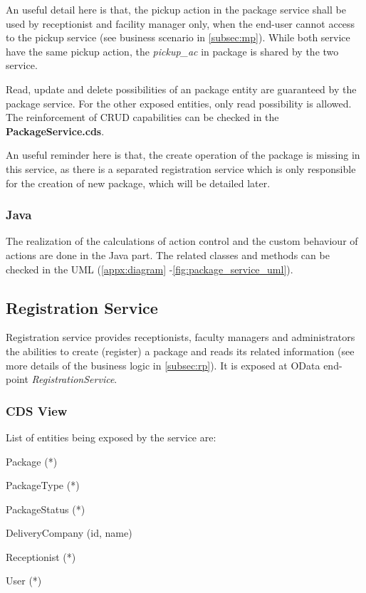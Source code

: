 An useful detail here is that, the pickup action in the package service shall be used by receptionist and facility manager only, when the end-user cannot access to the pickup service (see business scenario in \autoref{subsec:mp}). While both service have the same pickup action, the \textit{pickup\_ac} in package is shared by the two service.

Read, update and delete possibilities of an package entity are guaranteed by the package service. For the other exposed entities, only read possibility is allowed. The reinforcement of CRUD capabilities can be checked in the \textbf{PackageService.cds}. 

An useful reminder here is that, the create operation of the package is missing in this service, as there is a separated registration service which is only responsible for the creation of new package, which will be detailed later.

\subsubsection{Java}

The realization of the calculations of action control and the custom behaviour of actions are done in the Java part. The related classes and methods can be checked in the UML (\autoref{appx:diagram} -\autoref{fig:package_service_uml}). 


\subsection{Registration Service}
\label{subsec:back-rp}

Registration service provides receptionists, faculty managers and administrators the abilities to create (register) a package and reads its related information (see more details of the business logic in \autoref{subsec:rp}). 
It is exposed at OData end-point \textit{RegistrationService}. 

\subsubsection{CDS View}

\noindent
List of entities being exposed by the service are:
\begin{compactenum}
	\item Package (*)
    \item PackageType (*)
    \item PackageStatus (*)
    \item DeliveryCompany (id, name)
    \item Receptionist (*)
    \item User (*)
\end{compactenum}

